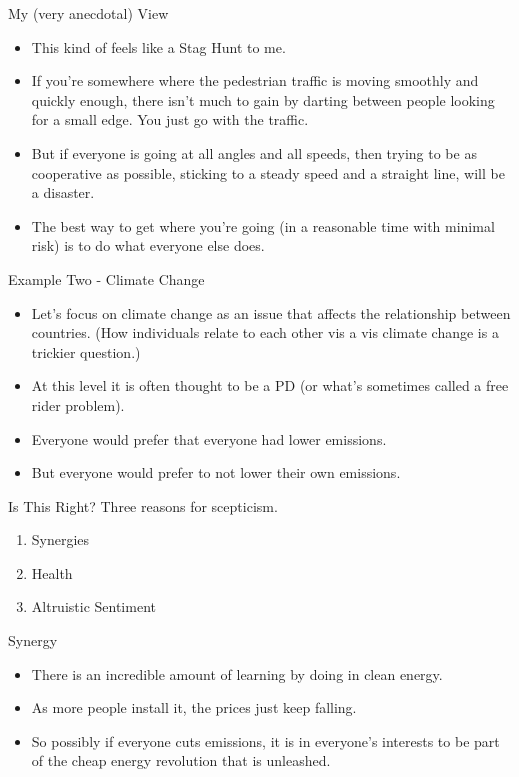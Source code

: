 \documentclass[
  ignorenonframetext,
]{beamer}
\providecommand{\tightlist}{%
  \setlength{\itemsep}{0pt}\setlength{\parskip}{0pt}}
\begin{document}
\begin{frame}{My (very anecdotal) View}
\protect\hypertarget{my-very-anecdotal-view}{}
\begin{itemize}
\tightlist
\item
  This kind of feels like a Stag Hunt to me.
\item
  If you're somewhere where the pedestrian traffic is moving smoothly
  and quickly enough, there isn't much to gain by darting between people
  looking for a small edge. You just go with the traffic.
\item
  But if everyone is going at all angles and all speeds, then trying to
  be as cooperative as possible, sticking to a steady speed and a
  straight line, will be a disaster.
\item
  The best way to get where you're going (in a reasonable time with
  minimal risk) is to do what everyone else does.
\end{itemize}
\end{frame}

\begin{frame}{Example Two - Climate Change}
\protect\hypertarget{example-two---climate-change}{}
\begin{itemize}
\tightlist
\item
  Let's focus on climate change as an issue that affects the
  relationship between countries. (How individuals relate to each other
  vis a vis climate change is a trickier question.)
\item
  At this level it is often thought to be a PD (or what's sometimes
  called a free rider problem).
\item
  Everyone would prefer that everyone had lower emissions.
\item
  But everyone would prefer to not lower their own emissions.
\end{itemize}
\end{frame}

\begin{frame}{Is This Right?}
\protect\hypertarget{is-this-right}{}
Three reasons for scepticism.

\begin{enumerate}
\tightlist
\item
  Synergies
\item
  Health
\item
  Altruistic Sentiment
\end{enumerate}
\end{frame}

\begin{frame}{Synergy}
\protect\hypertarget{synergy}{}
\begin{itemize}
\tightlist
\item
  There is an incredible amount of learning by doing in clean energy.
\item
  As more people install it, the prices just keep falling.
\item
  So possibly if everyone cuts emissions, it is in everyone's interests
  to be part of the cheap energy revolution that is unleashed.
\end{itemize}
\end{frame}
\end{document}
